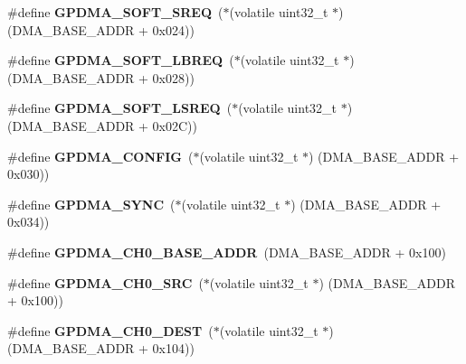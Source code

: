 \begin{DoxyCompactItemize}
\item 
\mbox{\label{group__lpc24xx__regs_ga8a1a5faefcf27ebcb1390c8cbed98643}} 
\#define {\bfseries G\+P\+D\+M\+A\+\_\+\+S\+O\+F\+T\+\_\+\+S\+R\+EQ}~($\ast$(volatile uint32\+\_\+t $\ast$) (D\+M\+A\+\_\+\+B\+A\+S\+E\+\_\+\+A\+D\+DR + 0x024))
\item 
\mbox{\label{group__lpc24xx__regs_ga3a59d43853c1c68577b202a3a0fbedbc}} 
\#define {\bfseries G\+P\+D\+M\+A\+\_\+\+S\+O\+F\+T\+\_\+\+L\+B\+R\+EQ}~($\ast$(volatile uint32\+\_\+t $\ast$) (D\+M\+A\+\_\+\+B\+A\+S\+E\+\_\+\+A\+D\+DR + 0x028))
\item 
\mbox{\label{group__lpc24xx__regs_gac71dbd809178835703144c30849f12eb}} 
\#define {\bfseries G\+P\+D\+M\+A\+\_\+\+S\+O\+F\+T\+\_\+\+L\+S\+R\+EQ}~($\ast$(volatile uint32\+\_\+t $\ast$) (D\+M\+A\+\_\+\+B\+A\+S\+E\+\_\+\+A\+D\+DR + 0x02\+C))
\item 
\mbox{\label{group__lpc24xx__regs_ga060a120f1510c33fa7de14f8d7cd3580}} 
\#define {\bfseries G\+P\+D\+M\+A\+\_\+\+C\+O\+N\+F\+IG}~($\ast$(volatile uint32\+\_\+t $\ast$) (D\+M\+A\+\_\+\+B\+A\+S\+E\+\_\+\+A\+D\+DR + 0x030))
\item 
\mbox{\label{group__lpc24xx__regs_gabd5fb14c1c74036e59d29c5649e97de6}} 
\#define {\bfseries G\+P\+D\+M\+A\+\_\+\+S\+Y\+NC}~($\ast$(volatile uint32\+\_\+t $\ast$) (D\+M\+A\+\_\+\+B\+A\+S\+E\+\_\+\+A\+D\+DR + 0x034))
\item 
\mbox{\label{group__lpc24xx__regs_ga82a7f743542512c6f5c4ee168390d348}} 
\#define {\bfseries G\+P\+D\+M\+A\+\_\+\+C\+H0\+\_\+\+B\+A\+S\+E\+\_\+\+A\+D\+DR}~(D\+M\+A\+\_\+\+B\+A\+S\+E\+\_\+\+A\+D\+DR + 0x100)
\item 
\mbox{\label{group__lpc24xx__regs_ga4e020664fe1e52294ced053613c30600}} 
\#define {\bfseries G\+P\+D\+M\+A\+\_\+\+C\+H0\+\_\+\+S\+RC}~($\ast$(volatile uint32\+\_\+t $\ast$) (D\+M\+A\+\_\+\+B\+A\+S\+E\+\_\+\+A\+D\+DR + 0x100))
\item 
\mbox{\label{group__lpc24xx__regs_ga761c9bc05da6355261472176a6c77223}} 
\#define {\bfseries G\+P\+D\+M\+A\+\_\+\+C\+H0\+\_\+\+D\+E\+ST}~($\ast$(volatile uint32\+\_\+t $\ast$) (D\+M\+A\+\_\+\+B\+A\+S\+E\+\_\+\+A\+D\+DR + 0x104))

\end{DoxyCompactItemize}
